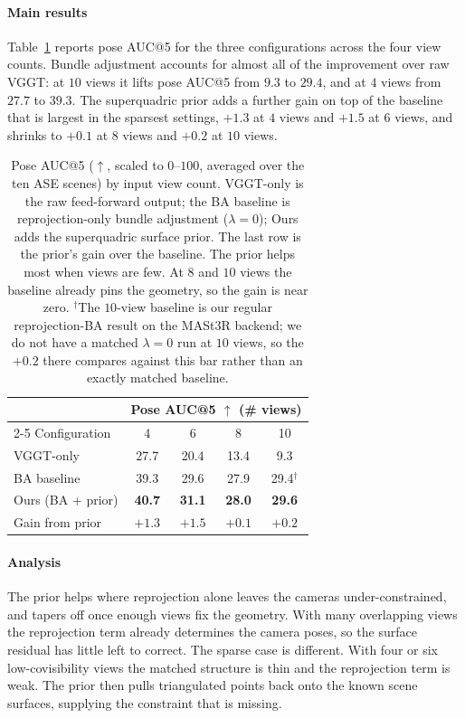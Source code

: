 \paragraph{Main results}
Table~\ref{tab:pose_auc} reports pose AUC@5 for the three configurations across the four view counts. Bundle adjustment accounts for almost all of the improvement over raw VGGT: at $10$ views it lifts pose AUC@5 from $9.3$ to $29.4$, and at $4$ views from $27.7$ to $39.3$. The superquadric prior adds a further gain on top of the baseline that is largest in the sparsest settings, $+1.3$ at $4$ views and $+1.5$ at $6$ views, and shrinks to $+0.1$ at $8$ views and $+0.2$ at $10$ views.

\begin{table}[t]
  \centering
  \begin{tabular}{l cccc}
    \toprule
    & \multicolumn{4}{c}{Pose AUC@5 $\uparrow$ (\# views)} \\
    \cmidrule(lr){2-5}
    Configuration & 4 & 6 & 8 & 10 \\
    \midrule
    VGGT-only        & 27.7 & 20.4 & 13.4 & \phantom{0}9.3 \\
    BA baseline      & 39.3 & 29.6 & 27.9 & 29.4$^{\dagger}$ \\
    Ours (BA + prior) & \textbf{40.7} & \textbf{31.1} & \textbf{28.0} & \textbf{29.6} \\
    \midrule
    Gain from prior  & $+1.3$ & $+1.5$ & $+0.1$ & $+0.2$ \\
    \bottomrule
  \end{tabular}
  \caption{Pose AUC@5 ($\uparrow$, scaled to $0$--$100$, averaged over the ten ASE scenes) by input view count. VGGT-only is the raw feed-forward output; the BA baseline is reprojection-only bundle adjustment ($\lambda = 0$); Ours adds the superquadric surface prior. The last row is the prior's gain over the baseline. The prior helps most when views are few. At $8$ and $10$ views the baseline already pins the geometry, so the gain is near zero. $^{\dagger}$The $10$-view baseline is our regular reprojection-BA result on the MASt3R backend; we do not have a matched $\lambda = 0$ run at $10$ views, so the $+0.2$ there compares against this bar rather than an exactly matched baseline.}
  \label{tab:pose_auc}
\end{table}

\paragraph{Analysis}
The prior helps where reprojection alone leaves the cameras under-constrained, and tapers off once enough views fix the geometry. With many overlapping views the reprojection term already determines the camera poses, so the surface residual has little left to correct. The sparse case is different. With four or six low-covisibility views the matched structure is thin and the reprojection term is weak. The prior then pulls triangulated points back onto the known scene surfaces, supplying the constraint that is missing.

